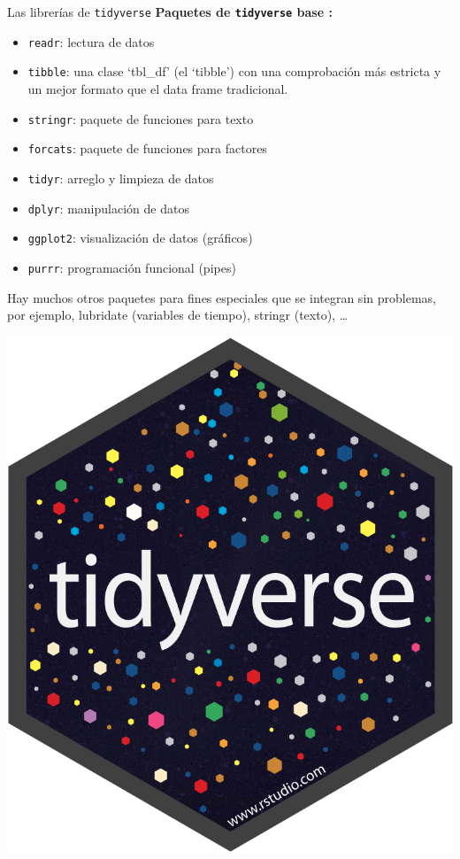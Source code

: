 \documentclass[
  ignorenonframetext,
  aspectratio=169]{beamer}
\providecommand{\tightlist}{%
  \setlength{\itemsep}{0pt}\setlength{\parskip}{0pt}}
\begin{document}
\begin{frame}[fragile]{Las librerías de \texttt{tidyverse}}
\label{las-libreruxedas-de-tidyverse}
\textbf{Paquetes de \texttt{tidyverse} base :}

\begin{itemize}
\tightlist
\item
  \texttt{readr}: lectura de datos
\item
  \texttt{tibble}: una clase `tbl\_df' (el `tibble') con una
  comprobación más estricta y un mejor formato que el data frame
  tradicional.
\item
  \texttt{stringr}: paquete de funciones para texto
\item
  \texttt{forcats}: paquete de funciones para factores
\item
  \texttt{tidyr}: arreglo y limpieza de datos
\item
  \texttt{dplyr}: manipulación de datos
\item
  \texttt{ggplot2}: visualización de datos (gráficos)
\item
  \texttt{purrr}: programación funcional (pipes)
\end{itemize}

Hay muchos otros paquetes para fines especiales que se integran sin
problemas, por ejemplo, lubridate (variables de tiempo), stringr
(texto), \ldots{}

\begin{flushright}\includegraphics[width=0.05\linewidth]{Imgs/hex-tidyverse} \end{flushright}
\end{frame}
\end{document}
